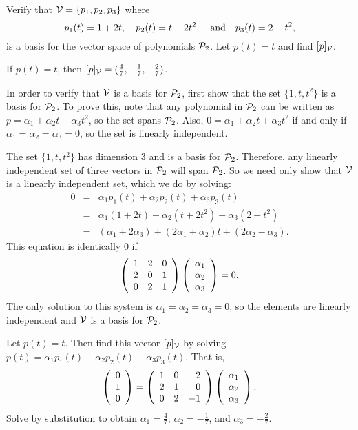 \documentclass{ximera}
\begin{document}
\begin{exercise} \label{c7.1.4}
Verify that ${\cal V}= \{p_1,p_2,p_3\}$ where
\[
p_1(t)=1+2t, \quad p_2(t)=t+2t^2, \quad\mbox{and}\quad p_3(t)=2-t^2,
\]
is a basis for the vector space of polynomials ${\cal P}_2$.
Let $p(t)=t$ and find $[p]_{\cal V}$.

\begin{solution}

\ans If $p(t) = t$, then
$[p]_{\cal V} = (\frac{4}{7}, -\frac{1}{7}, -\frac{2}{7})$.

\soln In order to verify that ${\cal V}$ is a basis for ${\cal P}_2$, first
show that the set $\{1,t,t^2\}$ is a basis for ${\cal P}_2$.  To prove
this, note that any polynomial in ${\cal P}_2$ can be written as
$p = \alpha_1 + \alpha_2t + \alpha_3t^2$, so the set spans ${\cal P}_2$.
Also, $0 = \alpha_1 + \alpha_2t + \alpha_3t^2$ if and only if
$\alpha_1 = \alpha_2 = \alpha_3 = 0$, so the set is linearly
independent.

\para The set $\{1,t,t^2\}$ has dimension 3 and is a basis for
${\cal P}_2$.  Therefore, any linearly independent set of three vectors
in ${\cal P}_2$ will span ${\cal P}_2$.  So we need only show that
${\cal V}$ is a linearly independent set, which we do by solving:
\[
\begin{array}{rcl}
0 & = & \alpha_1p_1(t) + \alpha_2p_2(t) + \alpha_3p_3(t) \\
& = & \alpha_1(1 + 2t) + \alpha_2(t + 2t^2) + \alpha_3(2 - t^2) \\
& = & (\alpha_1 + 2\alpha_3) + (2\alpha_1 + \alpha_2)t +
(2\alpha_2 - \alpha_3). \end{array}
\]
This equation is identically $0$ if
\[
\left(\begin{array}{rrr} 1 & 2 & 0 \\ 2 & 0 & 1 \\ 0 & 2 & 1\end{array}\right)\left(\begin{array}{r} \alpha_1 \\ \alpha_2 \\ \alpha_3\end{array}\right) = 0.
\]
The only solution to this system is $\alpha_1 = \alpha_2 = \alpha_3
 = 0$, so the elements are linearly independent and ${\cal V}$ is
a basis for ${\cal P}_2$.

\para Let $p(t) = t$.  Then find this vector $[p]_{\cal V}$ by solving
$p(t) = \alpha_1p_1(t) + \alpha_2p_2(t) + \alpha_3p_3(t)$. 
That is,
\[ \left(\begin{array}{r} 0 \\ 1 \\ 0\end{array}\right) = \left(\begin{array}{rrr} 1 & 0 & 2 \\ 2 & 1 & 0 \\ 0 & 2 & -1\end{array}\right)
\left(\begin{array}{r} \alpha_1 \\ \alpha_2 \\ \alpha_3\end{array}\right). \]
Solve by substitution to obtain $\alpha_1 = \frac{4}{7}$, $\alpha_2
= -\frac{1}{7}$, and $\alpha_3 = -\frac{2}{7}$.

\end{solution}
\end{exercise}
\end{document}
